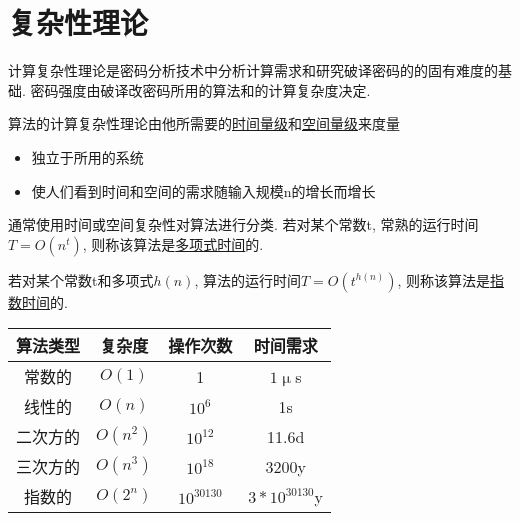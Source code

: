 \documentclass[UTF8]{ctexart}
\begin{document}
    \section{复杂性理论}
    计算复杂性理论是密码分析技术中分析计算需求和研究破译密码的的固有难度的基础. 密码强度由破译改密码所用的算法和的计算复杂度决定.

    算法的计算复杂性理论由他所需要的\underline{时间量级}和\underline{空间量级}来度量
    \begin{itemize}
        \item 独立于所用的系统
        \item 使人们看到时间和空间的需求随输入规模n的增长而增长
    \end{itemize}
    通常使用时间或空间复杂性对算法进行分类. 若对某个常数t, 常熟的运行时间$T=O(n^t)$, 则称该算法是\underline{多项式时间}的.

    若对某个常数t和多项式$h(n)$, 算法的运行时间$T=O(t^{h(n)})$, 则称该算法是\underline{指数时间}的.

    \centering
    \begin{tabular}{c|c|c|c} %
        \hline
        算法类型& 复杂度& 操作次数& 时间需求\\
        \hline
        常数的& $O(1)$& 1& $1\upmu$s\\
        线性的& $O(n)$& $10^6$& 1s\\
        二次方的& $O(n^2)$& $10^{12}$& 11.6d\\
        三次方的& $O(n^3)$& $10^{18}$& 3200y\\
        指数的& $O(2^n)$& $10^{30130}$& $3*10^{30130}$y\\
        \hline
    \end{tabular}
\end{document}

